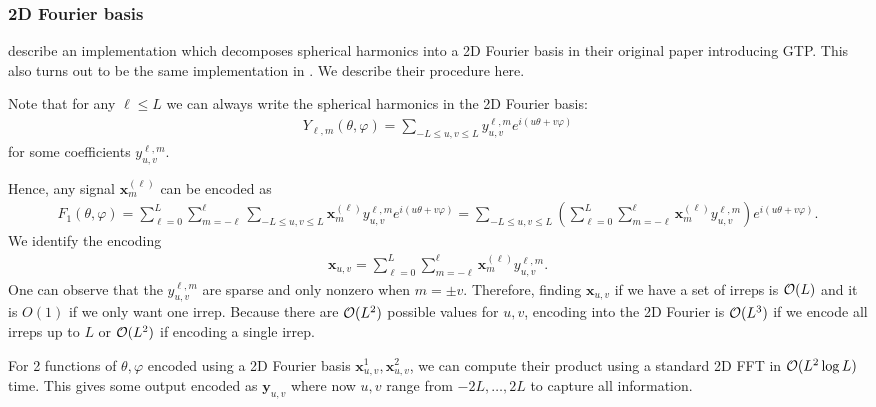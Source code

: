 \subsubsection{2D Fourier basis}
\citet{gaunt} describe an implementation which decomposes spherical harmonics into a 2D Fourier basis in their original paper introducing GTP. This also turns out to be the same implementation in \citet{xin2021fast}. We describe their procedure here.

Note that for any $\ell\leq L$ we can always write the spherical harmonics in the 2D Fourier basis:
\begin{align}
    Y_{\ell,m}(\theta,\varphi)=\sum_{-L\leq u,v\leq L}y^{\ell,m}_{u,v}e^{i(u\theta+v\varphi)}
\end{align}
for some coefficients $y^{\ell,m}_{u,v}$.

Hence, any signal $\mathbf{x}^{(\ell)}_m$ can be encoded as
\begin{align}
F_1(\theta,\varphi)=\sum_{\ell=0}^L\sum_{m=-\ell}^\ell\sum_{-L\leq u,v\leq L}\mathbf{x}^{(\ell)}_m y^{\ell,m}_{u,v}e^{i(u\theta+v\varphi)}=\sum_{-L\leq u,v\leq L}\left(\sum_{\ell=0}^L\sum_{m=-\ell}^\ell\mathbf{x}^{(\ell)}_m y^{\ell,m}_{u,v}\right)e^{i(u\theta+v\varphi)}.
\end{align}
We identify the encoding
\begin{align}
\mathbf{x}_{u,v}=\sum_{\ell=0}^L\sum_{m=-\ell}^\ell\mathbf{x}^{(\ell)}_m y^{\ell,m}_{u,v}. 
\end{align}
One can observe that the $y^{\ell,m}_{u,v}$ are sparse and only nonzero when $m=\pm v$. Therefore, finding $\mathbf{x}_{u,v}$ if we have a set of irreps is $\mathcal{O}(L)$ and it is $O(1)$ if we only want one irrep. Because there are $\mathcal{O}(L^2)$ possible values for $u,v$, encoding into the 2D Fourier is $\mathcal{O}(L^3)$ if we encode all irreps up to $L$ or $\mathcal{O}(L^2)$ if encoding a single irrep.

For 2 functions of $\theta,\varphi$ encoded using a 2D Fourier basis $\mathbf{x}^1_{u,v},\mathbf{x}^2_{u,v}$, we can compute their product using a standard 2D FFT in $\mathcal{O}(L^2\log L)$ time. This gives some output encoded as $\mathbf{y}_{u,v}$ where now $u,v$ range from $-2L,\ldots,2L$ to capture all information.

